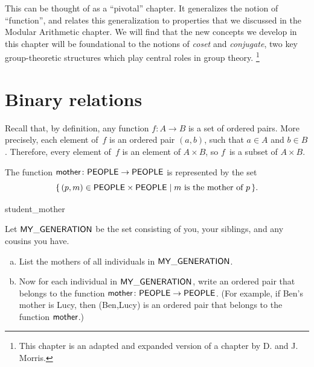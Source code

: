 



\medskip\noindent

This can be thought of as a ``pivotal'' chapter. It generalizes the notion of ``function'', and relates this generalization to properties that we discussed in the Modular Arithmetic chapter. We will find that the new concepts we develop in this chapter will be foundational to the notions of \emph{coset} and \emph{conjugate}, two key group-theoretic structures which play central roles in group theory.
\footnote{This chapter  is an adapted and expanded version of a chapter by D. and J. Morris.}

\section{Binary relations} \label{sec.relation}


 Recall that, by definition, any function $f \colon A \to B$ is a set of ordered pairs. More precisely, each element of~$f$ is an ordered pair $(a,b)$, such that $a \in A$ and $b \in B$. Therefore, every element of~$f$ is an element of $A \times B$, so $f$~is a subset of $A \times B$.


\begin{eg} 
The function $\sf{mother} \colon \sf{PEOPLE} \to \sf{PEOPLE}$ is represented by the set
\[ \{\, (p,m)  \in  {\sf{P}EOPLE} \times {\sf{P}EOPLE}  \mid  m  \text{  is the mother of } p \,\} .\]
\end{eg}

\begin{exercise}{student_mother}

\noindent
Let $\sf{MY\_GENERATION}$ be the set consisting  of you, your siblings, and any cousins you have.  
\begin{enumerate}[(a)]
\item
List the mothers of all individuals in $\sf{MY\_GENERATION}$.
\item
Now for each individual in $\sf{MY\_GENERATION}$, write an ordered pair that belongs to the function $\sf{mother} \colon \sf{PEOPLE} \to \sf{PEOPLE}$. (For example, if Ben's  mother is Lucy, then (Ben,Lucy) is an ordered pair that belongs to the function $\sf{mother}$.)
\end{enumerate}
\end{exercise}



